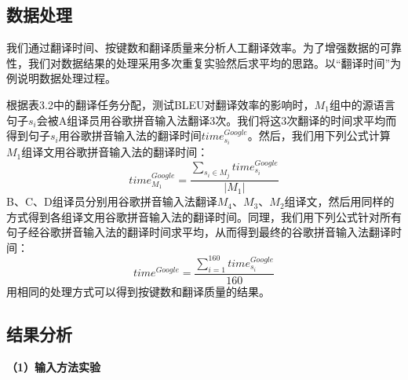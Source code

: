 \subsection{数据处理}

我们通过翻译时间、按键数和翻译质量来分析人工翻译效率。为了增强数据的可靠性，我们对数据结果的处理采用多次重复实验然后求平均的思路。以“翻译时间”为例说明数据处理过程。

根据表3.2中的翻译任务分配，测试BLEU对翻译效率的影响时，$M_1$组中的源语言句子$s_i$会被A组译员用谷歌拼音输入法翻译3次。我们将这3次翻译的时间求平均而得到句子$s_i$用谷歌拼音输入法的翻译时间$time_{s_i}^{Google}$。然后，我们用下列公式计算$M_1$组译文用谷歌拼音输入法的翻译时间：
\begin{equation}
time_{M_1}^{Google} = \frac{\sum_{s_i \in M_j} time_{s_i}^{Google}}{|M_1|}
\end{equation}
B、C、D组译员分别用谷歌拼音输入法翻译$M_4$、$M_3$、$M_2$组译文，然后用同样的方式得到各组译文用谷歌拼音输入法的翻译时间。同理，我们用下列公式针对所有句子经谷歌拼音输入法的翻译时间求平均，从而得到最终的谷歌拼音输入法翻译时间：
\begin{equation}
time^{Google} = \frac{\sum_{i=1}^{160} time_{s_i}^{Google}}{160}
\end{equation}
用相同的处理方式可以得到按键数和翻译质量的结果。

\subsection{结果分析}

\textbf{（1）输入方法实验}

